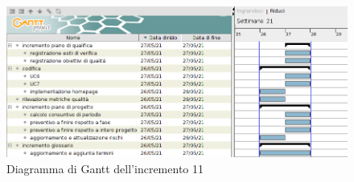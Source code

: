 \begin{figure}[!ht]
    \caption{Diagramma di Gantt dell'incremento 11}
    \vspace{5px}
    \includegraphics[scale=0.3]{../../../Images/Diagrammi/Gantt/incremento11.png}
    \centering
\end{figure}

